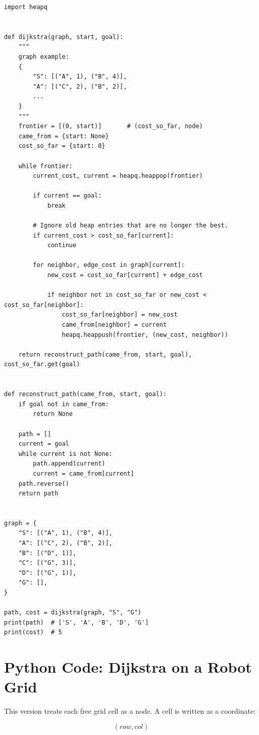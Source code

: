 \documentclass[11pt,a4paper]{article}
\begin{document}
\begin{lstlisting}[style=pythonstyle]
import heapq


def dijkstra(graph, start, goal):
    """
    graph example:
    {
        "S": [("A", 1), ("B", 4)],
        "A": [("C", 2), ("B", 2)],
        ...
    }
    """
    frontier = [(0, start)]       # (cost_so_far, node)
    came_from = {start: None}
    cost_so_far = {start: 0}

    while frontier:
        current_cost, current = heapq.heappop(frontier)

        if current == goal:
            break

        # Ignore old heap entries that are no longer the best.
        if current_cost > cost_so_far[current]:
            continue

        for neighbor, edge_cost in graph[current]:
            new_cost = cost_so_far[current] + edge_cost

            if neighbor not in cost_so_far or new_cost < cost_so_far[neighbor]:
                cost_so_far[neighbor] = new_cost
                came_from[neighbor] = current
                heapq.heappush(frontier, (new_cost, neighbor))

    return reconstruct_path(came_from, start, goal), cost_so_far.get(goal)


def reconstruct_path(came_from, start, goal):
    if goal not in came_from:
        return None

    path = []
    current = goal
    while current is not None:
        path.append(current)
        current = came_from[current]
    path.reverse()
    return path


graph = {
    "S": [("A", 1), ("B", 4)],
    "A": [("C", 2), ("B", 2)],
    "B": [("D", 1)],
    "C": [("G", 3)],
    "D": [("G", 1)],
    "G": [],
}

path, cost = dijkstra(graph, "S", "G")
print(path)  # ['S', 'A', 'B', 'D', 'G']
print(cost)  # 5
\end{lstlisting}

\section{Python Code: Dijkstra on a Robot Grid}

This version treats each free grid cell as a node. A cell is written as a coordinate:

\[
(row, col)
\]
\end{document}
